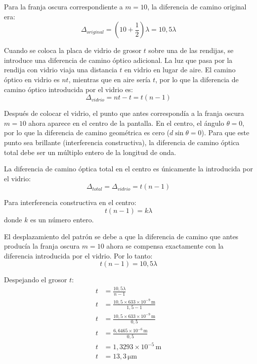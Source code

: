 \documentclass[
  11pt,
  letterpaper,
   addpoints,
   answers
  ]{exam}
\begin{document}
\begin{questions}
\begin{solution}
Para la franja oscura correspondiente a $m = 10$, la diferencia de camino original era:
\begin{equation}
\Delta_{original} = \left(10 + \frac{1}{2}\right) \lambda = 10{,}5 \lambda
\end{equation}

Cuando se coloca la placa de vidrio de grosor $t$ sobre una de las rendijas, se introduce una diferencia de camino óptico adicional. La luz que pasa por la rendija con vidrio viaja una distancia $t$ en vidrio en lugar de aire. El camino óptico en vidrio es $nt$, mientras que en aire sería $t$, por lo que la diferencia de camino óptico introducida por el vidrio es:
\begin{equation}
\Delta_{vidrio} = nt - t = t(n - 1)
\end{equation}

Después de colocar el vidrio, el punto que antes correspondía a la franja oscura $m = 10$ ahora aparece en el centro de la pantalla. En el centro, el ángulo $\theta = 0$, por lo que la diferencia de camino geométrica es cero ($d \sin \theta = 0$). Para que este punto sea brillante (interferencia constructiva), la diferencia de camino óptica total debe ser un múltiplo entero de la longitud de onda.

La diferencia de camino óptica total en el centro es únicamente la introducida por el vidrio:
\begin{equation}
\Delta_{total} = \Delta_{vidrio} = t(n - 1)
\end{equation}

Para interferencia constructiva en el centro:
\begin{equation}
t(n - 1) = k\lambda
\end{equation}
donde $k$ es un número entero.

El desplazamiento del patrón se debe a que la diferencia de camino que antes producía la franja oscura $m = 10$ ahora se compensa exactamente con la diferencia introducida por el vidrio. Por lo tanto:
\begin{equation}
t(n - 1) = 10{,}5 \lambda
\end{equation}

Despejando el grosor $t$:
\begin{align}
t &= \frac{10{,}5 \lambda}{n - 1} \\
t &= \frac{10{,}5 \times 633 \times 10^{-9}\,\mathrm{m}}{1{,}5 - 1} \\
t &= \frac{10{,}5 \times 633 \times 10^{-9}\,\mathrm{m}}{0{,}5} \\
t &= \frac{6{,}6465 \times 10^{-6}\,\mathrm{m}}{0{,}5} \\
t &= 1{,}3293 \times 10^{-5}\,\mathrm{m} \\
t &= 13{,}3\,\mathrm{\mu m}
\end{align}


\end{solution}
\end{questions}
\end{document}
